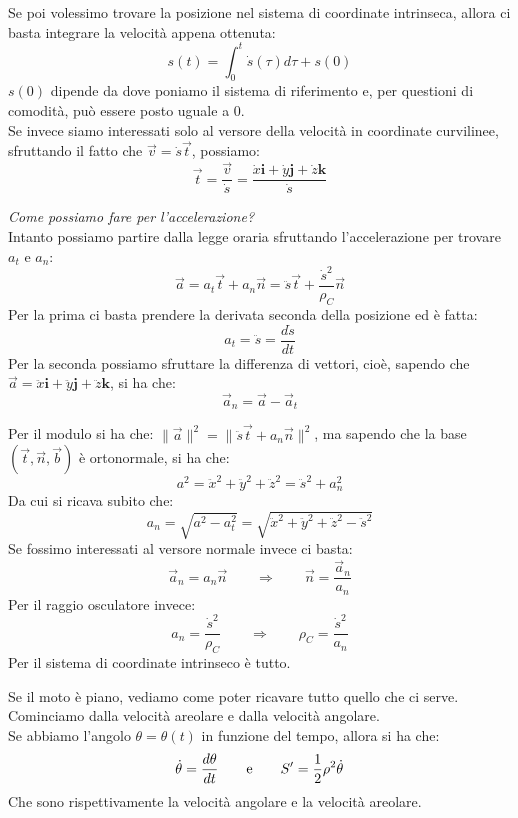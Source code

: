 \documentclass[11pt,a4paper,twoside]{article}
\theoremstyle{definition}
\begin{document}
Se poi volessimo trovare la posizione nel sistema di coordinate intrinseca, allora ci basta integrare la velocità appena ottenuta:
\[ s(t) = \int_0^t \dot s(\tau) d\tau + s(0) \]
$s(0)$ dipende da dove poniamo il sistema di riferimento e, per questioni di comodità, può essere posto uguale a $0$.\\
Se invece siamo interessati solo al versore della velocità in coordinate curvilinee, sfruttando il fatto che $\vec v = \dot s \vec t$, possiamo:
\[\vec t = \frac {\vec v} {\dot s} = \frac{\dot x \mathbf i + \dot y \mathbf j + \dot z \mathbf k}{\dot s}\]

\textit{Come possiamo fare per l'accelerazione?}\\
Intanto possiamo partire dalla legge oraria sfruttando l'accelerazione per trovare $a_t$ e $a_n$:
\[ \vec a = a_t \vec t + a_n \vec n = \ddot s \vec t + \frac{\dot s^2}{\rho_C} \vec n \]
Per la prima ci basta prendere la derivata seconda della posizione ed è fatta:
\[ a_t = \ddot s = \frac{d \dot s}{dt} \]
Per la seconda possiamo sfruttare la differenza di vettori, cioè, sapendo che $\vec a = \ddot x \mathbf i + \ddot y \mathbf j + \ddot z \mathbf k$, si ha che:
\[ \vec a_n = \vec a - \vec a_t \]

Per il modulo si ha che: $\|\vec a\|^2 = \|\ddot s \vec t + a_n \vec n\|^2 $, ma sapendo che la base $(\vec t, \vec n, \vec b)$ è ortonormale, si ha che:
\[ a^2 = \ddot x^2 + \ddot y^2 + \ddot z^2 = \ddot s^2 + a_n^2 \]
Da cui si ricava subito che:
\[ a_n = \sqrt{a^2 - a_t^2} = \sqrt{\ddot x^2 + \ddot y^2 + \ddot z^2 - \ddot s^2} \]
Se fossimo interessati al versore normale invece ci basta:
\[ \vec a_n = a_n \vec n \qquad \Rightarrow \qquad \vec n = \frac{\vec a_n}{a_n} \]
Per il raggio osculatore invece:
\[ a_n = \frac{\dot s^2}{\rho_C} \qquad \Rightarrow \qquad \rho_C = \frac{\dot s^2}{a_n} \]
Per il sistema di coordinate intrinseco è tutto.

Se il moto è piano, vediamo come poter ricavare tutto quello che ci serve.
Cominciamo dalla velocità areolare e dalla velocità angolare.\\
Se abbiamo l'angolo $\theta = \theta(t)$ in funzione del tempo, allora si ha che:
\[ \dot \theta = \frac{d \theta}{dt} \qquad \text e \qquad S' = \frac 12 \rho^2 \dot \theta\]
Che sono rispettivamente la velocità angolare e la velocità areolare.
\end{document}
